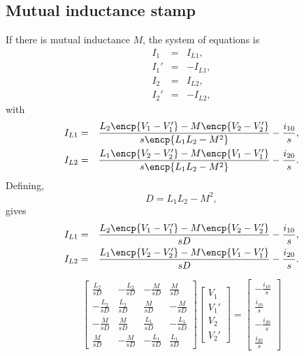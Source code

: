 \documentclass[a4paper, 12pt]{article}
\begin{document}
\subsection{Mutual inductance stamp}

If there is mutual inductance $M$, the system of equations is
%
\begin{eqnarray}
  I_1 & = & I_{L1}, \\
  I_1' & = & -I_{L1}, \\
  I_2 & = & I_{L2}, \\
  I_2' & = & -I_{L2},
\end{eqnarray}
%
with
%
\begin{eqnarray}
  I_{L1} & = & \frac{L_2\encp{V_1 - V_1'} - M\encp{V_2 - V_2'}}{s\encp{L_1 L_2 - M^2}} - \frac{i_{10}}{s}, \\
  I_{L2} & = & \frac{L_1\encp{V_2 - V_2'} - M\encp{V_1 - V_1'}}{s\encp{L_1 L_2 - M^2}} - \frac{i_{20}}{s}.
\end{eqnarray}
%
Defining,
%
\begin{equation}
  D  = L_1 L_2 - M^2,
\end{equation}
%
gives
%
\begin{eqnarray}
  I_{L1} & = & \frac{L_2\encp{V_1 - V_1'} - M\encp{V_2 - V_2'}}{sD} - \frac{i_{10}}{s}, \\
  I_{L2} & = & \frac{L_1\encp{V_2 - V_2'} - M\encp{V_1 - V_1'}}{sD} - \frac{i_{20}}{s}.
\end{eqnarray}
%

\begin{equation}
  \begin{bmatrix}
    \frac{L_2}{sD} & -\frac{L_2}{sD} & -\frac{M}{sD}  & \frac{M}{sD} \\
   -\frac{L_2}{sD} & \frac{L_2}{sD}  & \frac{M}{sD}  & -\frac{M}{sD} \\
  -\frac{M}{sD} & \frac{M}{sD} &  \frac{L_1}{sD} & -\frac{L_1}{sD}   \\
   \frac{M}{sD} & -\frac{M}{sD} & -\frac{L_1}{sD} & \frac{L_1}{sD}  
  \end{bmatrix}
  \begin{bmatrix}
    V_1 \\ V_1' \\ V_2 \\ V_2'
  \end{bmatrix}
=
\begin{bmatrix}
  -\frac{i_{10}}{s} \\ \frac{i_{10}}{s} \\
  -\frac{i_{20}}{s} \\ \frac{i_{20}}{s}
\end{bmatrix}
\label{eqn:mutual_stamp1}
\end{equation}
\end{document}
